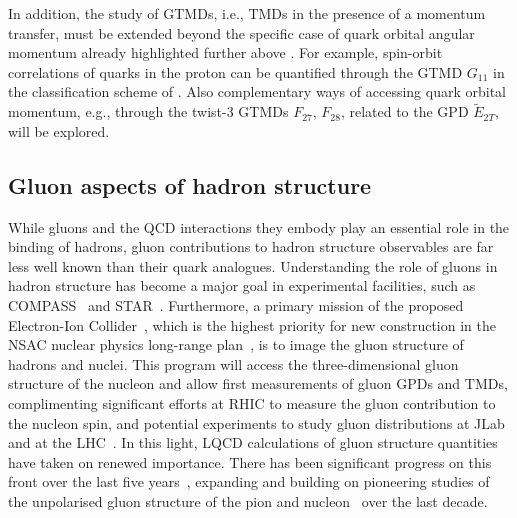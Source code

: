 In addition, the study of GTMDs, i.e., TMDs in the presence of a
momentum transfer, must be extended beyond the specific case of quark
orbital angular momentum already highlighted further above
\cite{Engelhardt:2017miy}. For example, spin-orbit correlations of quarks
in the proton can be quantified through the GTMD $G_{11} $ in the
classification scheme of \cite{Meissner:2009ww}.
Also complementary ways of accessing quark orbital
momentum, e.g., through the twist-3 GTMDs $F_{27} $, $F_{28} $, related
to the GPD $\widetilde{E}_{2T} $, will be explored.











\subsection{Gluon aspects of hadron structure}

%



While gluons and the QCD interactions they embody play an essential role in the binding of hadrons, gluon contributions to hadron structure observables are far less well known than their quark analogues. Understanding the role of gluons in hadron structure has become a major goal in experimental facilities, such as COMPASS~\cite{Adare:2014hsq} and STAR~\cite{Djawotho:2013pga}. Furthermore, a primary mission of the proposed Electron-Ion Collider~\cite{Accardi:2012qut,Kalantarians:2014eda}, which is the highest priority for new construction in the NSAC nuclear physics long-range plan~\cite{Geesaman:2015fha}, is to image the gluon structure of hadrons and nuclei. This program will access the three-dimensional gluon structure of the nucleon and allow first measurements of gluon GPDs and TMDs, complimenting significant efforts at RHIC to measure the gluon contribution to the nucleon spin, and potential experiments to study gluon distributions at JLab~\cite{Maxwell:2018gci,Hattawy:2017woc,Dobbs:2017vjw} and at the LHC~\cite{Baltz:2007kq}. 
%
In this light, LQCD calculations of gluon structure quantities have taken on renewed importance. There has been significant progress on this front over the last five years~\cite{Alexandrou:2017oeh,Yang:2016plb,Detmold:2016gpy,Detmold:2017oqb,Winter:2017bfs,Alexandrou:2016ekb}, expanding and building on pioneering studies of the unpolarised gluon structure of the pion and nucleon~\cite{Meyer:2007tm,Horsley:2012pz,Alexandrou:2013tfa,Deka:2013zha} over the last decade. 

